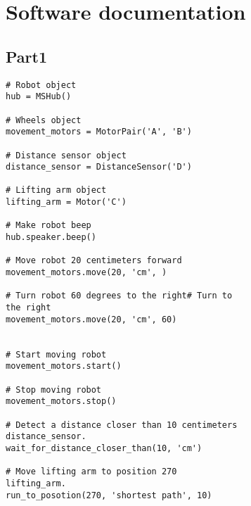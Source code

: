 \documentclass[10pt,twocolumn]{article}
\begin{document}
\section{Software documentation}
\subsection{Part1}

\begin{verbatim}
# Robot object 
hub = MSHub()

# Wheels object
movement_motors = MotorPair('A', 'B')

# Distance sensor object
distance_sensor = DistanceSensor('D')

# Lifting arm object 
lifting_arm = Motor('C')
    
# Make robot beep
hub.speaker.beep()

# Move robot 20 centimeters forward
movement_motors.move(20, 'cm', )

# Turn robot 60 degrees to the right# Turn to 
the right
movement_motors.move(20, 'cm', 60)


# Start moving robot 
movement_motors.start()

# Stop moving robot
movement_motors.stop()

# Detect a distance closer than 10 centimeters 
distance_sensor.
wait_for_distance_closer_than(10, 'cm')

# Move lifting arm to position 270
lifting_arm.
run_to_posotion(270, 'shortest path', 10)


\end{verbatim}


\printbibliography
\end{document}
